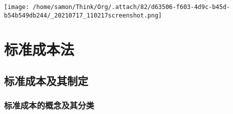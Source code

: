 \documentclass[11pt]{article}
\begin{document}
\begin{center}
\texttt{[image: /home/samon/Think/Org/.attach/82/d63506-f603-4d9c-b45d-b54b549db244/\_20210717\_110217screenshot.png]}
\end{center}

\section{标准成本法}
\label{sec:org21cf57d}
\subsection{标准成本及其制定}
\label{sec:org9dc6b78}
\subsubsection{标准成本的概念及其分类}
\label{sec:orgcbc02fa}
\end{document}
